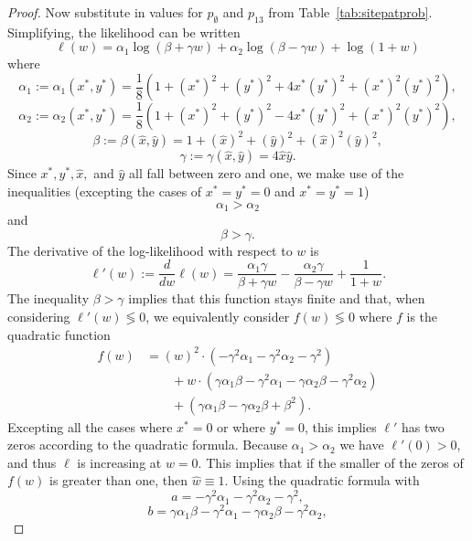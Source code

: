 \begin{proof}
Now substitute in values for $p_{\emptyset}$ and $p_{13}$ from Table~\ref{tab:sitepatprob}.
Simplifying, the likelihood can be written
\[
\ell(w) = \alpha_1\log(\beta+\gamma w) + \alpha_2\log(\beta-\gamma w) + \log(1+w)
\]
where
\[
\alpha_1 := \alpha_1(x^*, y^*) = \frac{1}{8} \left(1+(x^*)^2+(y^*)^2+4x^*(y^*)^2+(x^*)^2(y^*)^2\right),
\]
\[
\alpha_2 := \alpha_2(x^*, y^*) = \frac{1}{8}\left(1+(x^*)^2+(y^*)^2-4x^*(y^*)^2+(x^*)^2(y^*)^2\right),
\]
\[
\beta := \beta(\hat{x}, \hat{y}) = 1+(\hat{x})^2+(\hat{y})^2+(\hat{x})^2(\hat{y})^2,
\]
\[
\gamma := \gamma(\hat{x}, \hat{y}) = 4\hat{x}\hat{y}.
\]
Since $x^*,y^*,\hat{x},$ and $\hat{y}$ all fall between zero and one, we make use of the inequalities (excepting the cases of $x^*=y^*=0$ and $x^*=y^*=1$)
\[
\alpha_1 > \alpha_2
\]
and
\[
\beta > \gamma.
\]
The derivative of the log-likelihood with respect to $w$ is
\[
\ell'(w) := \frac{d}{dw} \ell(w) = \frac{\alpha_1 \gamma}{\beta+\gamma w} - \frac{\alpha_2 \gamma}{\beta-\gamma w} + \frac{1}{1+w}.
\]
The inequality $\beta > \gamma$ implies that this function stays finite and that, when considering $\ell'(w) \lessgtr 0$, we equivalently consider $f(w) \lessgtr 0$ where $f$ is the quadratic function
\begin{align*}
f(w) &= (w)^2\cdot(-\gamma^2\alpha_1-\gamma^2\alpha_2-\gamma^2) \\
      &\qquad + w\cdot(\gamma\alpha_1\beta-\gamma^2\alpha_1-\gamma\alpha_2\beta-\gamma^2\alpha_2) \\
      &\qquad + (\gamma\alpha_1\beta-\gamma\alpha_2\beta+\beta^2).
\end{align*}
Excepting all the cases where $x^*=0$ or where $y^*=0$, this implies $\ell'$ has two zeros according to the quadratic formula.
Because $\alpha_1 > \alpha_2$ we have $\ell'(0) > 0$, and thus $\ell$ is increasing at $w=0$.
This implies that if the smaller of the zeros of $f(w)$ is greater than one, then $\hat{w} \equiv 1$.
Using the quadratic formula with
\[
a = -\gamma^2 \alpha_1 - \gamma^2 \alpha_2 - \gamma^2,
\]
\[
b = \gamma \alpha_1 \beta - \gamma^2\alpha_1 - \gamma \alpha_2 \beta - \gamma^2 \alpha_2,
\]
\end{proof}
